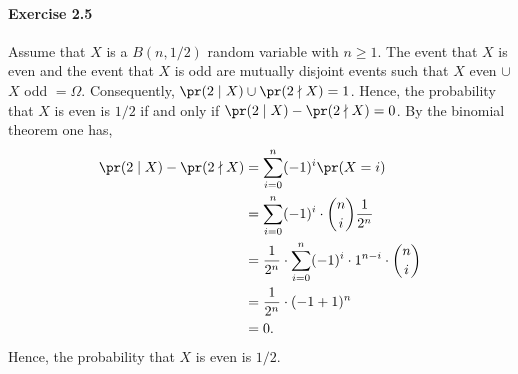 \paragraph{Exercise 2.5} Assume that $X$ is a $B(n, 1/2)$ random variable with
$n \geq 1$. The event that $X$ is even and the event that $X$ is odd are mutually
disjoint events such that {$X$ even} $\cup$ {$X$ odd} $= \Omega$. Consequently,
$\pr(2 \mid X) \cup \pr(2 \nmid X) = 1$. Hence, the probability that $X$ is even
is $1/2$ if and only if $\pr(2 \mid X) - \pr(2 \nmid X) = 0$.
By the binomial theorem one has,
\begin{align*}
  \pr(2 \mid X) - \pr(2 \nmid X)
    &= \sum_{i=0}^{n} (-1)^i \pr(X = i) \\
    &= \sum_{i=0}^{n} (-1)^i \cdot \binom{n}{i} \frac{1}{2^n} \\
    &= \frac{1}{2^n} \cdot \sum_{i=0}^{n} (-1)^i \cdot 1^{n-i} \cdot \binom{n}{i} \\
    &= \frac{1}{2^n} \cdot (-1 + 1)^n \\
    &= 0.
\end{align*}
Hence, the probability that $X$ is even is $1/2$.

